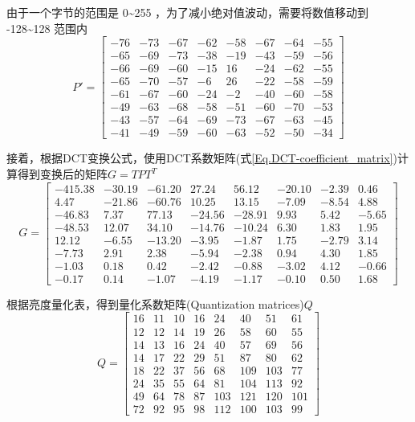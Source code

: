 由于一个字节的范围是 0\textasciitilde 255 ，为了减小绝对值波动，需要将数值移动到 -128\textasciitilde 128 范围内
\begin{equation}
    P'=\begin{bmatrix}
    -76 & -73 & -67 & -62 & -58 & -67 & -64 & -55 \\
    -65 & -69 & -73 & -38 & -19 & -43 & -59 & -56 \\
    -66 & -69 & -60 & -15 & 16 & -24 & -62 & -55 \\
    -65 & -70 & -57 & -6 & 26 & -22 & -58 & -59 \\
    -61 & -67 & -60 & -24 & -2 & -40 & -60 & -58 \\
    -49 & -63 & -68 & -58 & -51 & -60 & -70 & -53 \\
    -43 & -57 & -64 & -69 & -73 & -67 & -63 & -45 \\
    -41 & -49 & -59 & -60 & -63 & -52 & -50 & -34
    \end{bmatrix}
\end{equation}

接着，根据DCT变换公式，使用DCT系数矩阵(式\ref{Eq.DCT-coefficient_matrix})计算得到变换后的矩阵$G=TPT^T$
\begin{equation}
    G=\begin{bmatrix}
    -415.38 & -30.19 & -61.20 & 27.24 & 56.12 & -20.10 & -2.39 & 0.46 \\
    4.47 & -21.86 & -60.76 & 10.25 & 13.15 & -7.09 & -8.54 & 4.88 \\
    -46.83 & 7.37 & 77.13 & -24.56 & -28.91 & 9.93 & 5.42 & -5.65 \\
    -48.53 & 12.07 & 34.10 & -14.76 & -10.24 & 6.30 & 1.83 & 1.95 \\
    12.12 & -6.55 & -13.20 & -3.95 & -1.87 & 1.75 & -2.79 & 3.14 \\
    -7.73 & 2.91 & 2.38 & -5.94 & -2.38 & 0.94 & 4.30 & 1.85 \\
    -1.03 & 0.18 & 0.42 & -2.42 & -0.88 & -3.02 & 4.12 & -0.66 \\
    -0.17 & 0.14 & -1.07 & -4.19 & -1.17 & -0.10 & 0.50 & 1.68
    \end{bmatrix}
\end{equation}


根据亮度量化表，得到量化系数矩阵(Quantization matrices)$Q$
\begin{equation}
    Q=\begin{bmatrix}
    16 & 11 & 10 & 16 & 24 & 40 & 51 & 61 \\
    12 & 12 & 14 & 19 & 26 & 58 & 60 & 55 \\
    14 & 13 & 16 & 24 & 40 & 57 & 69 & 56 \\
    14 & 17 & 22 & 29 & 51 & 87 & 80 & 62 \\
    18 & 22 & 37 & 56 & 68 & 109 & 103 & 77 \\
    24 & 35 & 55 & 64 & 81 & 104 & 113 & 92 \\
    49 & 64 & 78 & 87 & 103 & 121 & 120 & 101 \\
    72 & 92 & 95 & 98 & 112 & 100 & 103 & 99
    \end{bmatrix}
\end{equation}

